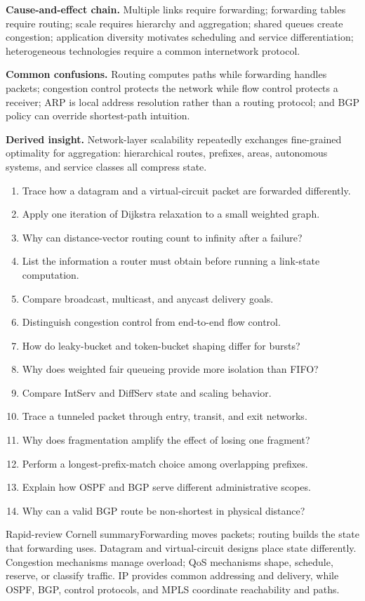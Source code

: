 \documentclass[10pt,letterpaper]{article}
\begin{document}
\begin{overviewbox}\textbf{Cause-and-effect chain.} Multiple links require forwarding; forwarding tables require routing; scale requires hierarchy and aggregation; shared queues create congestion; application diversity motivates scheduling and service differentiation; heterogeneous technologies require a common internetwork protocol.\par
\textbf{Common confusions.} Routing computes paths while forwarding handles packets; congestion control protects the network while flow control protects a receiver; ARP is local address resolution rather than a routing protocol; and BGP policy can override shortest-path intuition.\par
\textbf{Derived insight.} Network-layer scalability repeatedly exchanges fine-grained optimality for aggregation: hierarchical routes, prefixes, areas, autonomous systems, and service classes all compress state.\end{overviewbox}


\begin{enumerate}
  \item Trace how a datagram and a virtual-circuit packet are forwarded differently.
  \item Apply one iteration of Dijkstra relaxation to a small weighted graph.
  \item Why can distance-vector routing count to infinity after a failure?
  \item List the information a router must obtain before running a link-state computation.
  \item Compare broadcast, multicast, and anycast delivery goals.
  \item Distinguish congestion control from end-to-end flow control.
  \item How do leaky-bucket and token-bucket shaping differ for bursts?
  \item Why does weighted fair queueing provide more isolation than FIFO?
  \item Compare IntServ and DiffServ state and scaling behavior.
  \item Trace a tunneled packet through entry, transit, and exit networks.
  \item Why does fragmentation amplify the effect of losing one fragment?
  \item Perform a longest-prefix-match choice among overlapping prefixes.
  \item Explain how OSPF and BGP serve different administrative scopes.
  \item Why can a valid BGP route be non-shortest in physical distance?
\end{enumerate}
\begin{CornellSummaryBox}{Rapid-review Cornell summary}Forwarding moves packets; routing builds the state that forwarding uses. Datagram and virtual-circuit designs place state differently. Congestion mechanisms manage overload; QoS mechanisms shape, schedule, reserve, or classify traffic. IP provides common addressing and delivery, while OSPF, BGP, control protocols, and MPLS coordinate reachability and paths.\end{CornellSummaryBox}
\end{document}
